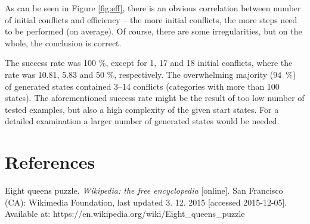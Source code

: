 \documentclass[a4paper]{article}
\begin{document}
As can be seen in Figure \ref{fig:eff}, there is an obvious correlation between number of initial conflicts and efficiency -- the more initial conflicts, the more steps need to be performed (on average).  Of course, there are some irregularities, but on the whole, the conclusion is correct. 

The success rate was 100 \%, except for 1, 17 and 18 initial conflicts, where the rate was 10.81, 5.83 and 50 \%, respectively. The overwhelming majority (94~\%) of generated states contained 3--14 conflicts (categories with more than 100 states). The aforementioned success rate might be the result of too low number of tested examples, but also a high complexity of the given start states. For a detailed examination a larger number of generated states would be needed.


\section{References}

Eight queens puzzle. \textit{Wikipedia: the free encyclopedia} [online]. San Francisco (CA): Wikimedia Foundation, last updated 3. 12. 2015 [accessed 2015-12-05]. Available at: https://en.wikipedia.org/wiki/Eight\_queens\_puzzle
\end{document}

